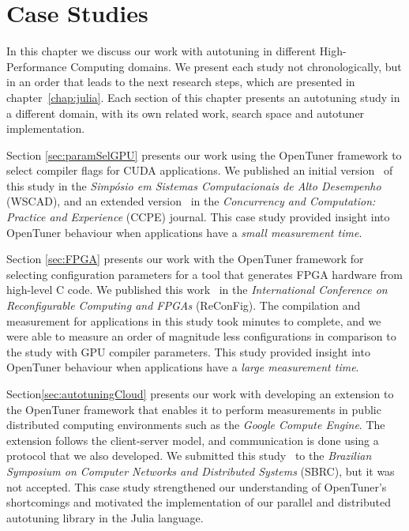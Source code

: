 \chapter{Case Studies}
\label{chap:usecases}

In this chapter we discuss our work with autotuning in different
High-Performance Computing domains. We present each study not chronologically,
but in an order that leads to the next research steps, which are presented in
chapter~\ref{chap:julia}. Each section of this chapter presents an autotuning
study in a different domain, with its own related work, search space and
autotuner implementation.

Section \ref{sec:paramSelGPU} presents our work using the OpenTuner framework
to select compiler flags for CUDA applications.  We published an initial
version~\cite{bruel2015autotuningGPU} of this study in the \textit{Simpósio em
Sistemas Computacionais de Alto Desempenho} (WSCAD), and an extended
version~\cite{bruel2017autotuning} in the \textit{Concurrency and Computation:
Practice and Experience} (CCPE) journal.  This case study provided insight into
OpenTuner behaviour when applications have a \textit{small measurement time}.

Section \ref{sec:FPGA} presents our work with the OpenTuner framework for
selecting configuration parameters for a tool that generates FPGA hardware from
high-level C code.  We published this work~\cite{} in the \textit{International
Conference on Reconfigurable Computing and FPGAs} (ReConFig).  The compilation
and measurement for applications in this study took minutes to complete, and we
were able to measure an order of magnitude less configurations in comparison to
the study with GPU compiler parameters. This study provided insight into
OpenTuner behaviour when applications have a \textit{large measurement time}.


Section\ref{sec:autotuningCloud} presents our work with developing an extension
to the OpenTuner framework that enables it to perform measurements in public
distributed computing environments such as the \textit{Google Compute Engine}.
The extension follows the client-server model, and communication is done using
a protocol that we also developed. We submitted this study~\cite{bruel2016new}
to the \textit{Brazilian Symposium on Computer Networks and Distributed
Systems} (SBRC), but it was not accepted. This case study strengthened our
understanding of OpenTuner's shortcomings and motivated the implementation
of our parallel and distributed autotuning library in the Julia language.

